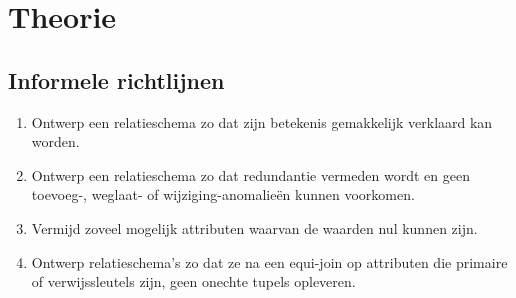 \documentclass[normaalvormen.tex]{subfiles}
\begin{document}
\chapter{Theorie}
\section{Informele richtlijnen}
\begin{enumerate}
\item Ontwerp een relatieschema zo dat zijn betekenis gemakkelijk verklaard kan worden.

\item Ontwerp een relatieschema zo dat redundantie vermeden wordt en geen toevoeg-, weglaat- of wijziging-anomalie\"en kunnen voorkomen.

\item Vermijd zoveel mogelijk attributen waarvan de waarden nul kunnen zijn.

\item Ontwerp relatieschema's zo dat ze na een equi-join op attributen die primaire of verwijssleutels zijn, geen onechte tupels opleveren.
\end{enumerate}
\end{document}
